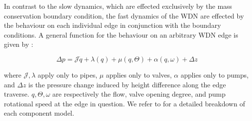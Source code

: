 In contrast to the slow dynamics, which are effected exclusively by the mass conservation boundary condition, the fast dynamics of the WDN are effected by the behaviour on each individual edge in conjunction with the boundary conditions. A general function for the behaviour on an arbitrary WDN edge is given by \cite{Jensen}:

\begin{equation}\label{eq:GeneralEdgeModel}
	\Delta p = \mathcal{J}\dot{q} + \lambda(q) + \mu(q,\Theta) + \alpha(q,\omega) + \Delta z
\end{equation}

where $\mathcal{J},\lambda$ apply only to pipes, $\mu$ applies only to valves, $\alpha$ applies only to pumps, and $\Delta z$ is the pressure change induced by height difference along the edge traverse. $q,\Theta,\omega$ are respectively the flow, valve opening degree, and pump rotational speed at the edge in question. We refer to \cite{Swamee2008,KallesoePhD} for a detailed breakdown of each component model.

%
%
%


